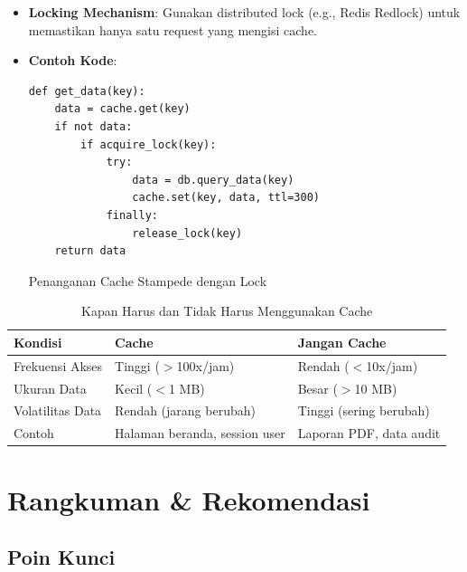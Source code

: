 \documentclass[11pt, a4paper]{book}
\begin{document}
\begin{itemize}
\begin{itemize}
\begin{itemize}
				\item \textbf{Locking Mechanism}:  
				Gunakan distributed lock (e.g., Redis Redlock) untuk memastikan hanya satu request yang mengisi cache.
				
				\item \textbf{Contoh Kode}:
				\begin{listing}[H]
				\begin{verbatim}
def get_data(key):
    data = cache.get(key)
    if not data:
        if acquire_lock(key):
            try:
                data = db.query_data(key)
                cache.set(key, data, ttl=300)
            finally:
                release_lock(key)
    return data
				\end{verbatim}
				\caption{Penanganan Cache Stampede dengan Lock}	
				\end{listing}
				
			\end{itemize}
		\end{itemize}
	\end{itemize}
	
	\begin{table}[htbp]
		\centering
		\caption{Kapan Harus dan Tidak Harus Menggunakan Cache}
		\label{tab:cache-decision}
		\begin{tabularx}{\textwidth}{|l|X|X|}
			\hline
			\textbf{Kondisi} & \textbf{Cache} & \textbf{Jangan Cache} \\ \hline
			Frekuensi Akses & Tinggi ($>$100x/jam) & Rendah ($<$10x/jam) \\ \hline
			Ukuran Data & Kecil ($<$1 MB) & Besar ($>$10 MB) \\ \hline
			Volatilitas Data & Rendah (jarang berubah) & Tinggi (sering berubah) \\ \hline
			Contoh & Halaman beranda, session user & Laporan PDF, data audit \\ \hline
		\end{tabularx}
	\end{table}
	
	\chapter{Rangkuman \& Rekomendasi}
	\label{chap:rangkuman}
	
	\section{Poin Kunci}
	\label{sec:poin-kunci}
	
\end{document}
